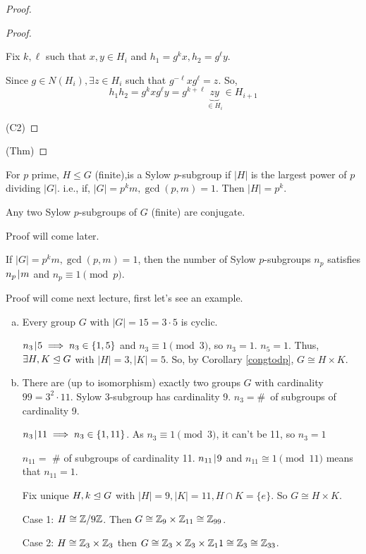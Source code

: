 \documentclass[notes.tex]{subfiles}
\begin{document}
\begin{proof}
\begin{proof}
\begin{itemize}
		Fix $k, \ell $ such that $x, y \in H_i$ and $h_1 = g^kx, h_2 = g^\ell y$.

		Since $g\in N(H_i), \exists z\in H_i$ such that $g^{-\ell}xg^\ell = z$.
		So, \[h_1h_2 = g^kxg^\ell y = g^{k+\ell}\underbrace{zy}_{\in H_i} \in H_{i+1}\]
	\end{itemize}
	\qedhere(C2)
	\end{proof}
	\qedhere(Thm)
\end{proof}

\begin{defn}
	For $p$ prime, $H\le G$ (finite),is a Sylow $p$-subgroup if $|H|$ is the largest power of $p$ dividing $|G|$.
	i.e., if, $|G| = p^km, \gcd(p, m) = 1$. Then $|H| = p^k$.
\end{defn}

\begin{theorem}[Sylow 2]
\label{sylow2} Any two Sylow $p$-subgroups of $G$ (finite) are conjugate.
\end{theorem}
Proof will come later.

\begin{theorem}[Sylow 3]
	\label{sylow3}
	If $|G| = p^km, \gcd(p, m) = 1$, then the number of Sylow $p$-subgroups $n_p$ satisfies $n_p \mkern2mu|\mkern1mu m$ and $n_p\equiv 1 \pmod p$.
\end{theorem}

Proof will come next lecture, first let's see an example.
\begin{eg}\leavevmode
	\begin{enumerate}[a)]
		\item Every group $G$ with $|G| = 15 = 3\cdot 5$ is cyclic.

		$n_3 \mkern2mu|\mkern1mu 5 \implies n_3 \in \{1, 5\}$ and $n_3 \equiv 1 \pmod 3$, so $n_3 = 1$.
		$n_5 = 1$. Thus, $\exists H, K\trianglelefteq G$ with $|H| = 3, |K| = 5$. So, by Corollary \ref{congtodp}, $G\cong H\times K$.
		\item There are (up to isomorphism) exactly two groups $G$ with cardinality $99 = 3^2\cdot 11$.
		Sylow 3-subgroup has cardinality 9. $n_3 = $\#~of subgroups of cardinality 9.

		$n_3 \mkern2mu|\mkern1mu 11\implies n_3\in \{1, 11\}$. As $n_3 \equiv 1\pmod 3$, it can't be 11, so $n_3 = 1$

		$n_{11} = $ \# of subgroups of cardinality 11. $n_{11} \mkern2mu|\mkern1mu 9$ and $n_{11}\cong 1 \pmod 11$ means that $n_{11} = 1$.

		Fix unique $H, k\trianglelefteq G$ with $|H| = 9, |K| = 11, H\cap K = \{e\}$.
		So $G \cong H\times K$.

		Case 1: $H\cong \mathbb{Z}/9\mathbb{Z}$. Then $G\cong \mathbb{Z}_9\times \mathbb{Z}_{11} \cong \mathbb{Z}_{99}$.

		Case 2: $H\cong \mathbb{Z}_3\times \mathbb{Z}_3$ then $G \cong \mathbb{Z}_3\times\mathbb{Z}_3 \times \mathbb{Z}_11\cong \mathbb{Z}_3\cong \mathbb{Z}_{33}$.
	\end{enumerate}
\end{eg}
\end{document}
